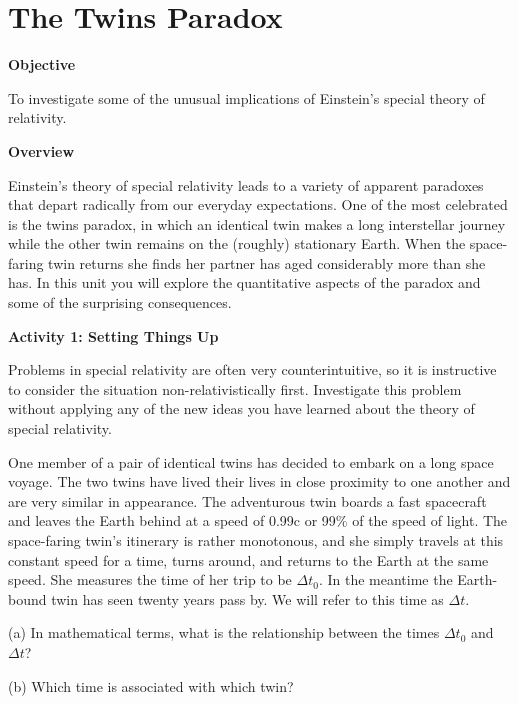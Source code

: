 
\section{The Twins Paradox}

\makelabheader %

\textbf{Objective}

To investigate some of the unusual implications of Einstein's special
theory of relativity.

\textbf{Overview}

Einstein's theory of special relativity leads to a variety of apparent
paradoxes that depart radically from our everyday expectations. One
of the most celebrated is the twins paradox, in which an identical
twin makes a long interstellar journey while the other twin remains
on the (roughly) stationary Earth. When the space-faring twin returns
she finds her partner has aged considerably more than she has. In
this unit you will explore the quantitative aspects of the paradox
and some of the surprising consequences.

\textbf{Activity 1: Setting Things Up}

Problems in special relativity are often very counterintuitive, so
it is instructive to consider the situation non-relativistically first.
Investigate this problem without applying any of the new ideas you
have learned about the theory of special relativity.

One member of a pair of identical twins has decided to embark on a
long space voyage. The two twins have lived their lives in close proximity
to one another and are very similar in appearance. The adventurous
twin boards a fast spacecraft and leaves the Earth behind at a speed
of 0.99c or 99\% of the speed of light. The space-faring twin's itinerary
is rather monotonous, and she simply travels at this constant speed
for a time, turns around, and returns to the Earth at the same speed.
She measures the time of her trip to be \( \Delta  t_{0} \).
In the meantime the Earth-bound twin has seen twenty years pass by.
We will refer to this time as \( \Delta  t\).

(a) In mathematical terms, what is the relationship between the times
\( \Delta  t_{0} \) and \( \Delta t \)?
\vspace{15mm}

(b) Which time is associated with which twin?
\vspace{15mm}

